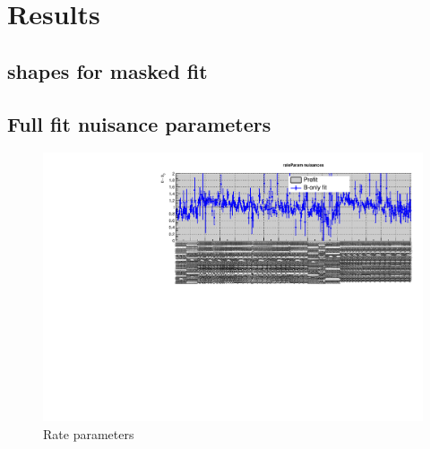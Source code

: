 \section{Results}
\label{app:results}

\subsection{\texorpdfstring{\mht}{MHT} shapes for masked fit }
\label{app:mhtshapes}



%
%

\clearpage
\subsection{Full fit nuisance parameters}
\label{app:nuispost}

\begin{figure}[h!]
  \centering
  \caption{Rate parameters}
  \includegraphics[width=1.\linewidth]{figures/results/36invfb_preapproval/postfit/nuis/Rates_nuisances}
\end{figure}

